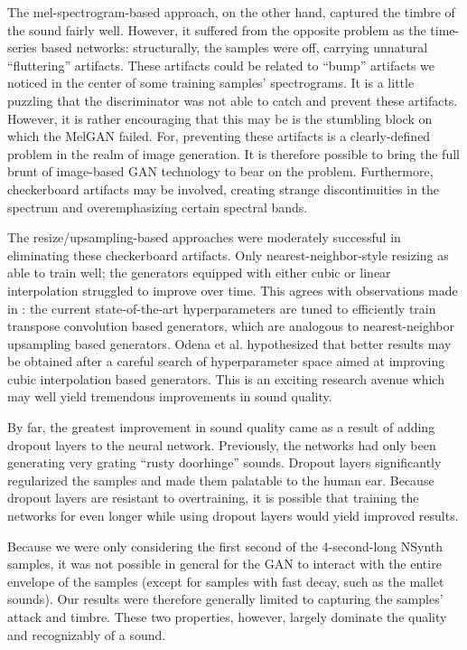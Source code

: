 The mel-spectrogram-based approach, on the other hand, captured the timbre of the sound fairly well. However, it suffered from the opposite problem as the time-series based networks: structurally, the samples were off, carrying unnatural ``fluttering'' artifacts. These artifacts could be related to ``bump'' artifacts we noticed in the center of some training samples' spectrograms. It is a little puzzling that the discriminator was not able to catch and prevent these artifacts. However, it is rather encouraging that this may be is the stumbling block on which the MelGAN failed. For, preventing these artifacts is a clearly-defined problem in the realm of image generation. It is therefore possible to bring the full brunt of image-based GAN technology to bear on the problem. Furthermore, checkerboard artifacts may be involved, creating strange discontinuities in the spectrum and overemphasizing certain spectral bands.

The resize/upsampling-based approaches were moderately successful in eliminating these checkerboard artifacts. Only nearest-neighbor-style resizing as able to train well;  the generators equipped with either cubic or linear interpolation struggled to improve over time. This agrees with observations made in \cite{Odena2016DeconvolutionAC}: the current state-of-the-art hyperparameters are tuned to efficiently train transpose convolution based generators, which are analogous to nearest-neighbor upsampling based generators. Odena et al. hypothesized that better results may be obtained after a careful search of hyperparameter space aimed at improving cubic interpolation based generators. This is an exciting research avenue which may well yield tremendous improvements in sound quality.

By far, the greatest improvement in sound quality came as a result of adding dropout layers to the neural network. Previously, the networks had only been generating very grating ``rusty doorhinge'' sounds. Dropout layers significantly regularized the samples and made them palatable to the human ear. Because dropout layers are resistant to overtraining, it is possible that training the networks for even longer while using dropout layers would yield improved results.

Because we were only considering the first second of the 4-second-long NSynth samples, it was not possible in general for the GAN to interact with the entire envelope of the samples (except for samples with fast decay, such as the mallet sounds). Our results were therefore generally limited to capturing the samples' attack and timbre. These two properties, however, largely dominate the quality and recognizably of a sound.

